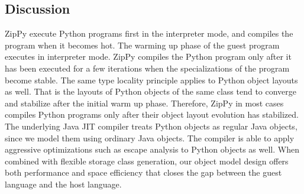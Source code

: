 \subsection{Discussion}

ZipPy execute Python programs first in the interpreter mode, and compiles the program when it becomes hot.
The warming up phase of the guest program executes in interpreter mode.
ZipPy compiles the Python program only after it has been executed for a few iterations when the specializations of the program become stable.
The same type locality principle applies to Python object layouts as well.
That is the layouts of Python objects of the same class tend to converge and stabilize after the initial warm up phase.
Therefore, ZipPy in most cases compiles Python programs only after their object layout evolution has stabilized.
The underlying Java JIT compiler treats Python objects as regular Java objects, since we model them using ordinary Java objects.
The compiler is able to apply aggressive optimizations such as escape analysis to Python objects as well.
When combined with flexible storage class generation, our object model design offers both performance and space efficiency that closes the gap between the guest language and the host language.
